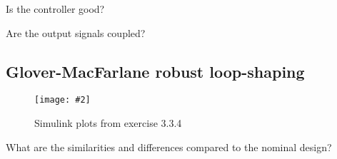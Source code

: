 \documentclass[a4paper,11pt]{article}
\newcommand{\image}[3][width=1.0\columnwidth]{
	\begin{figure}[h!]
		\centering
	    \texttt{[image: \#2]}
		\caption{#3}
		\label{fig:#2}
	\end{figure}
}
\begin{document}
	Is the controller good?
	\par\dotfill\par\dotfill\par
	Are the output signals coupled?
	\par\dotfill\par\dotfill

	\subsection*{Glover-MacFarlane robust loop-shaping}

	\image{figure_6.pdf}{Simulink plots from exercise 3.3.4}

	What are the similarities and differences compared to the nominal design?
	\par\dotfill\par\dotfill
\end{document}
